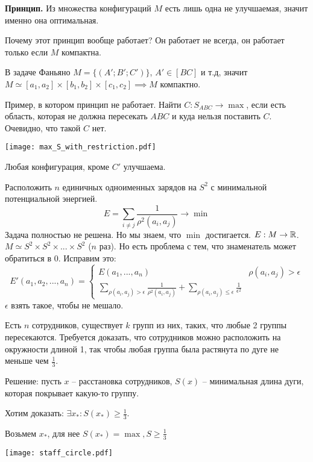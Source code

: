 \documentclass[main]{subfiles}
\begin{document}
\textbf{Принцип.} Из множества конфигураций $M$ есть лишь одна не улучшаемая, значит именно она оптимальная.

Почему этот принцип вообще работает?
Он работает не всегда, он работает только если $M$ компактна.

В задаче Фаньяно $M = \{(A';B';C')\}$, $A' \in [BC]$ и т.д, значит
$M \simeq [a_1, a_2] \times [b_1, b_2] \times [c_1, c_2] \implies M$ компактно.

\begin{example}
    Пример, в котором принцип не работает.
    Найти $C: S_{ABC} \to \max$, если есть область, которая не должна пересекать $ABC$ и куда нельзя поставить $C$.
    Очевидно, что такой $C$ нет.
    \begin{center}
        \texttt{[image: max\_S\_with\_restriction.pdf]}
    \end{center}
    Любая конфигурация, кроме $C'$ улучшаема.
\end{example}

\begin{example}
    Расположить $n$ единичных одноименных зарядов на $S^2$ с минимальной потенциальной энергией.
    \[E = \sum_{i \neq j} \frac{1}{\rho^2 (a_i, a_j)} \to \min\]
    Задача полностью не решена.
    Но мы знаем, что $\min$ достигается.
    $E: M \to \mathbb{R}$. $M \simeq S^2 \times S^2 \times ... \times S^2$ ($n$ раз).
    Но есть проблема с тем, что знаменатель может обратиться в 0.
    Исправим это:
    \[E'(a_1, a_2, ..., a_n) = \begin{cases}
            E(a_1, ..., a_n) & \rho(a_i, a_j) > \epsilon \\
            \displaystyle\sum_{\rho(a_i, a_j) > \epsilon} \frac{1}{\rho^2(a_i, a_j)} + \sum_{\rho(a_i, a_j) \le \epsilon} \frac{1}{\epsilon^2}
        \end{cases}\]
    $\epsilon$ взять такое, чтобы не мешало.
\end{example}

\begin{example}
    Есть $n$ сотрудников, существует $k$ групп из них, таких, что любые 2 группы пересекаются.
    Требуется доказать, что сотрудников можно расположить на окружности длиной 1,
    так чтобы любая группа была растянута по дуге не меньше чем $\frac{1}{3}$.

    Решение: пусть $x$ -- расстановка сотрудников, $S(x)$ -- минимальная длина дуги, которая покрывает какую-то группу.

    Хотим доказать: $\exists x_*: S(x_*) \ge \frac{1}{3}$.

    Возьмем $x_*$, для нее $S(x_*) = \max, S \ge \frac{1}{3}$
    \begin{center}
        \texttt{[image: staff\_circle.pdf]}
    \end{center}
\end{example}
\end{document}
